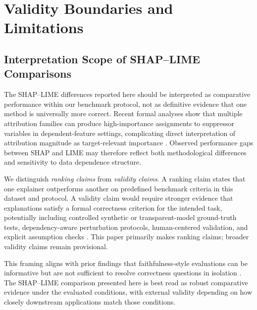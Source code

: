 \documentclass[twoside,11pt]{article}
\begin{document}
\section{Validity Boundaries and Limitations}
\label{sec:validity}

\subsection{Interpretation Scope of SHAP--LIME Comparisons}
\label{sec:interpretation_scope}

The SHAP--LIME differences reported here should be interpreted as
comparative performance within our benchmark protocol, not as definitive
evidence that one method is universally more correct. Recent formal
analyses show that multiple attribution families can produce
high-importance assignments to suppressor variables in
dependent-feature settings, complicating direct interpretation of
attribution magnitude as target-relevant importance
\citep{wilming2022scrutinizing,wilming2023theoretical,haufe2026formalization}.
Observed performance gaps between SHAP and LIME may therefore reflect both
methodological differences and sensitivity to data dependence structure.

We distinguish \emph{ranking claims} from \emph{validity claims}. A
ranking claim states that one explainer outperforms another on predefined
benchmark criteria in this dataset and protocol. A validity claim would
require stronger evidence that explanations satisfy a formal correctness
criterion for the intended task, potentially including controlled
synthetic or transparent-model ground-truth tests, dependency-aware
perturbation protocols, human-centered validation, and explicit assumption checks
\citep{haufe2026formalization,doshivelez2017rigorous}. This paper
primarily makes ranking claims; broader validity claims remain provisional.

This framing aligns with prior findings that faithfulness-style evaluations
can be informative but are not sufficient to resolve correctness questions
in isolation \citep{jacovi2020faithfulness,adebayo2018sanity,
hooker2019benchmark,rong2022consistent}. The SHAP--LIME comparison
presented here is best read as robust comparative evidence under the
evaluated conditions, with external validity depending on how closely
downstream applications match those conditions.
\end{document}

